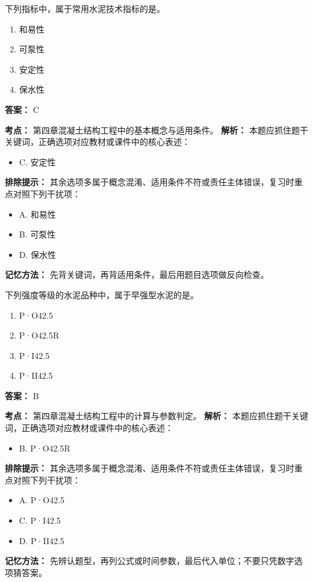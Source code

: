 \documentclass[UTF8,fontset=fandol,11pt]{ctexart}
\begin{document}
\begin{quizbox}[title={第 34 题}]
下列指标中，属于常用水泥技术指标的是。\\
\begin{enumerate}[label=\Alph*.]
\item 和易性
\item 可泵性
\item 安定性
\item 保水性
\end{enumerate}
\textbf{答案：} C
\vspace{0.25em}
\begin{answerbox}[title={考点解析}]
\textbf{考点：} 第四章混凝土结构工程中的基本概念与适用条件。
\textbf{解析：} 本题应抓住题干关键词，正确选项对应教材或课件中的核心表述：
\begin{itemize}
\item C. 安定性
\end{itemize}
\textbf{排除提示：} 其余选项多属于概念混淆、适用条件不符或责任主体错误，复习时重点对照下列干扰项：
\begin{itemize}
\item A. 和易性
\item B. 可泵性
\item D. 保水性
\end{itemize}
\textbf{记忆方法：} 先背关键词，再背适用条件，最后用题目选项做反向检查。
\end{answerbox}
\end{quizbox}

\begin{quizbox}[title={第 35 题}]
下列强度等级的水泥品种中，属于早强型水泥的是。\\
\begin{enumerate}[label=\Alph*.]
\item P·O42.5
\item P·O42.5R
\item P·I42.5
\item P·II42.5
\end{enumerate}
\textbf{答案：} B
\vspace{0.25em}
\begin{answerbox}[title={考点解析}]
\textbf{考点：} 第四章混凝土结构工程中的计算与参数判定。
\textbf{解析：} 本题应抓住题干关键词，正确选项对应教材或课件中的核心表述：
\begin{itemize}
\item B. P·O42.5R
\end{itemize}
\textbf{排除提示：} 其余选项多属于概念混淆、适用条件不符或责任主体错误，复习时重点对照下列干扰项：
\begin{itemize}
\item A. P·O42.5
\item C. P·I42.5
\item D. P·II42.5
\end{itemize}
\textbf{记忆方法：} 先辨认题型，再列公式或时间参数，最后代入单位；不要只凭数字选项猜答案。
\end{answerbox}
\end{quizbox}
\end{document}
